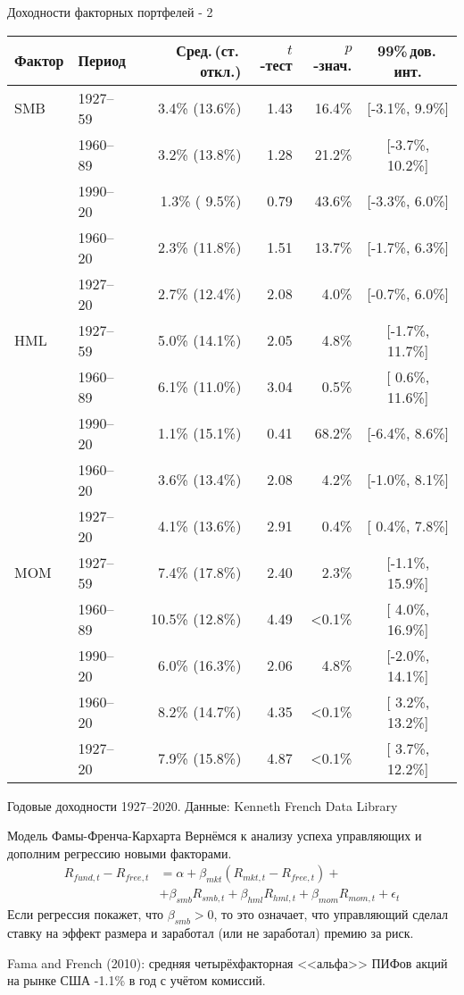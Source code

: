 \documentclass{beamer}
\begin{document}
\begin{frame}{Доходности факторных портфелей - 2}
\centering
\small
\begin{tabular}{l|l|r|r|r|c}
Фактор & Период & Сред.\,(ст.\,откл.) & $t$-тест & $p$-знач. & 99\%\,дов.\,инт.\\ \hline
SMB & 1927--59 &  3.4\% (13.6\%) & 1.43 & 16.4\% & [-3.1\%,  9.9\%] \\    
    & 1960--89 &  3.2\% (13.8\%) & 1.28 & 21.2\% & [-3.7\%, 10.2\%] \\
    & 1990--20 &  1.3\% ( 9.5\%) & 0.79 & 43.6\% & [-3.3\%,  6.0\%] \\    
    & 1960--20 &  2.3\% (11.8\%) & 1.51 & 13.7\% & [-1.7\%,  6.3\%] \\ 
    & 1927--20 &  2.7\% (12.4\%) & 2.08 &  4.0\% & [-0.7\%,  6.0\%] \\    
\hline
HML & 1927--59 &  5.0\% (14.1\%) & 2.05 &  4.8\% & [-1.7\%, 11.7\%] \\    
    & 1960--89 &  6.1\% (11.0\%) & 3.04 &  0.5\% & [ 0.6\%, 11.6\%] \\     
    & 1990--20 &  1.1\% (15.1\%) & 0.41 & 68.2\% & [-6.4\%,  8.6\%] \\    
    & 1960--20 &  3.6\% (13.4\%) & 2.08 &  4.2\% & [-1.0\%,  8.1\%] \\     
    & 1927--20 &  4.1\% (13.6\%) & 2.91 &  0.4\% & [ 0.4\%,  7.8\%] \\      
\hline
MOM & 1927--59 &  7.4\% (17.8\%) & 2.40 &  2.3\% & [-1.1\%, 15.9\%] \\    
    & 1960--89 & 10.5\% (12.8\%) & 4.49 & <0.1\% & [ 4.0\%, 16.9\%] \\ 
    & 1990--20 &  6.0\% (16.3\%) & 2.06 &  4.8\% & [-2.0\%, 14.1\%] \\  
    & 1960--20 &  8.2\% (14.7\%) & 4.35 & <0.1\% & [ 3.2\%, 13.2\%] \\  
    & 1927--20 &  7.9\% (15.8\%) & 4.87 & <0.1\% & [ 3.7\%, 12.2\%] \\  
\hline
\end{tabular}

{\scriptsize Годовые доходности 1927--2020. Данные: Kenneth French Data Library}
\end{frame}



\begin{frame}{Модель Фамы-Френча-Кархарта}
\justify
Вернёмся к анализу успеха управляющих и дополним регрессию новыми факторами.
\begin{align*}
R_{fund,t} - R_{free,t} &= \alpha + \beta_{mkt}(R_{mkt,t} - R_{free,t}) + \\ &+ \beta_{smb}R_{smb,t} + \beta_{hml}R_{hml,t} + \beta_{mom}R_{mom,t} + \epsilon_t
\end{align*}
Если регрессия покажет, что $\beta_{smb} > 0$, то это означает, что управляющий сделал ставку на эффект размера и заработал (или не заработал) премию за риск.

\vspace{\baselineskip}
Fama and French (2010): средняя четырёхфакторная <<альфа>> ПИФов акций на рынке США -1.1\% в год с учётом комиссий.
\end{frame}
\end{document}
